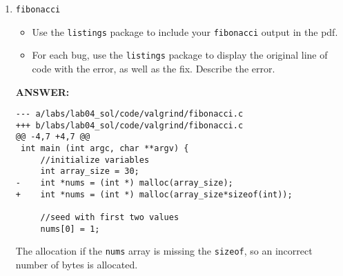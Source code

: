 \begin{enumerate}
\begin{lstlisting}[frame=single]
--- a/labs/lab04_sol/code/gdb/matrixTest.c
+++ b/labs/lab04_sol/code/gdb/matrixTest.c
@@ -155,7 +155,7 @@ void testTallSkinny(){
     }
   }
 
-  printf("Testing matrixVecProd a short and fat matrix\n");
+  printf("Testing matrixVecProd a tall and skinny matrix\n");
 
   printA(m, n, A);
\end{lstlisting}
The print text refers to the wrong test.
 
\begin{lstlisting}[frame=single]
--- a/labs/lab04_sol/code/gdb/matrixTest.c
+++ b/labs/lab04_sol/code/gdb/matrixTest.c
@@ -170,7 +170,7 @@ void testTallSkinny(){
   
   double* c = vecDiff(m, b, ans);
   
-  if(norm(m, b)<tol){
+  if(norm(m, c)<tol){
     printf("Test passed!\n");
   }
   else{
\end{lstlisting}
The test should check the norm of the error vector, c, not the right-hand side vector b.
    
    \newpage
    \item \texttt{fibonacci}
    \begin{itemize}
        \item Use the \texttt{listings} package to include your \texttt{fibonacci} output in the pdf.
        \item For each bug, use the \texttt{listings} package to display the original line of code with the error, as well as the fix.  Describe the error.
    \end{itemize}
    \textbf{ANSWER:} %

    

\begin{lstlisting}[frame=single]
--- a/labs/lab04_sol/code/valgrind/fibonacci.c
+++ b/labs/lab04_sol/code/valgrind/fibonacci.c
@@ -4,7 +4,7 @@
 int main (int argc, char **argv) {
     //initialize variables
     int array_size = 30;
-    int *nums = (int *) malloc(array_size);
+    int *nums = (int *) malloc(array_size*sizeof(int));
     
     //seed with first two values
     nums[0] = 1;
\end{lstlisting}

The allocation if the \texttt{nums} array is missing the \texttt{sizeof}, so an incorrect number of bytes is allocated.


\end{enumerate}
